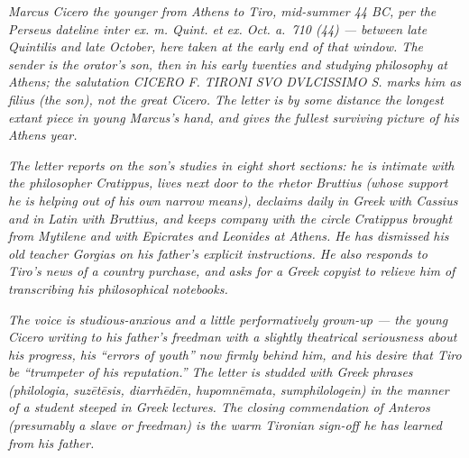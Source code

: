 
\textit{Marcus Cicero the younger from Athens to Tiro,
mid-summer 44 BC, per the Perseus dateline \textit{inter ex. m.
Quint. et ex. Oct. a.~710 (44)} --- between late Quintilis and
late October, here taken at the early end of that window. The
sender is the orator's son, then in his early twenties and
studying philosophy at Athens; the salutation \textit{CICERO F.
TIRONI SVO DVLCISSIMO S.} marks him as \textit{filius} (the son),
not the great Cicero. The letter is by some distance the longest
extant piece in young Marcus's hand, and gives the fullest
surviving picture of his Athens year.}

\textit{The letter reports on the son's studies in eight short
sections: he is intimate with the philosopher Cratippus, lives
next door to the rhetor Bruttius (whose support he is helping out
of his own narrow means), declaims daily in Greek with Cassius
and in Latin with Bruttius, and keeps company with the circle
Cratippus brought from Mytilene and with Epicrates and Leonides
at Athens. He has dismissed his old teacher Gorgias on his
father's explicit instructions. He also responds to Tiro's news
of a country purchase, and asks for a Greek copyist to relieve
him of transcribing his philosophical notebooks.}

\textit{The voice is studious-anxious and a little performatively
grown-up --- the young Cicero writing to his father's freedman
with a slightly theatrical seriousness about his progress, his
``errors of youth'' now firmly behind him, and his desire that
Tiro be ``trumpeter of his reputation.'' The letter is studded
with Greek phrases (\textit{philologia}, \textit{suz\=et\=esis},
\textit{diarrh\=ed\=en}, \textit{hupomn\=emata},
\textit{sumphilologein}) in the manner of a student steeped in
Greek lectures. The closing commendation of Anteros (presumably a
slave or freedman) is the warm Tironian sign-off he has learned
from his father.}
